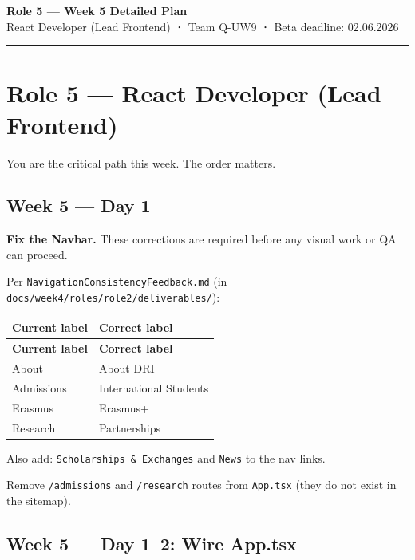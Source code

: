 \documentclass[11pt,a4paper]{article}
\begin{document}
\begin{center}
    {\Large\bfseries\color{uvtBlue} Role 5 — Week 5 Detailed Plan}\\[0.4em]
    {\small React Developer (Lead Frontend) \textbf{·} Team Q-UW9 \textbf{·} Beta deadline: 02.06.2026}
\end{center}
\vspace{0.3em}
\textcolor{uvtYellow}{\rule{\linewidth}{2pt}}
\vspace{0.8em}
\section{Role 5 — React Developer (Lead Frontend)}

You are the critical path this week. The order matters.

\subsection{Week 5 — Day 1}

\textbf{Fix the Navbar.} These corrections are required before any visual work or QA can proceed.

Per \nolinkurl{NavigationConsistencyFeedback.md} (in \nolinkurl{docs/week4/roles/role2/deliverables/}):

\begin{longtable}{@{}p{6.7cm}p{7.3cm}@{}}
\rowcolor{uvtLightBlue}
\textbf{Current label} & \textbf{Correct label} \\
\midrule
\endfirsthead
\rowcolor{uvtLightBlue}
\textbf{Current label} & \textbf{Correct label} \\
\midrule
\endhead
About & About DRI \\
Admissions & International Students \\
Erasmus & Erasmus+ \\
Research & Partnerships \\
\end{longtable}

Also add: \nolinkurl{Scholarships & Exchanges} and \nolinkurl{News} to the nav links.

Remove \nolinkurl{/admissions} and \nolinkurl{/research} routes from \nolinkurl{App.tsx} (they do not exist in the sitemap).

\subsection{Week 5 — Day 1–2: Wire App.tsx}
\end{document}
